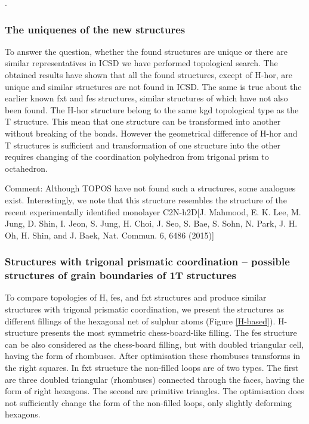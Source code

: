 .\documentclass[a4paperm]{article}
\begin{document}
\subsubsection{The uniquenes of the new structures}

To answer the question, whether the found structures are unique or there are similar representatives in ICSD we have performed topological search.
The obtained results have shown that all the found structures, except of H-hor, are unique and similar structures are not found in ICSD.
The same is true about the earlier known fxt and fes structures, similar structures of which have not also been found. 
The H-hor structure belong to the same kgd topological type as the T structure.
This mean that one structure can be transformed into another without breaking of the bonds.
However the geometrical difference of H-hor and T structures is sufficient and transformation of one structure into the other requires changing of the coordination polyhedron from trigonal prism to octahedron.

Comment:
Although TOPOS have not found such a structures, some analogues exist.
Interestingly, we note that this structure resembles the structure of the recent experimentally identified monolayer C2N-h2D[J. Mahmood, E. K. Lee, M. Jung, D. Shin, I. Jeon, S. Jung, H. Choi, J. Seo, S. Bae, S. Sohn, N. Park, J. H. Oh, H. Shin, and J.
Baek, Nat. Commun. 6, 6486 (2015)]



\subsubsection{Structures with trigonal prismatic coordination – possible structures of grain boundaries of 1T structures}

To compare topologies of H, fes, and fxt structures and produce similar structures with trigonal prismatic coordination, we present the structures as different fillings of the hexagonal net of sulphur atoms (Figure \ref{H-based}).
H-structure presents the most symmetric chess-board-like filling.
The fes structure can be also considered as the chess-board filling, but with doubled triangular cell, having the form of rhombuses.
After optimisation these rhombuses transforms in the right squares.
In fxt structure the non-filled loops are of two types.
The first are three doubled triangular (rhombuses) connected through the faces, having the form of right hexagons.
The second are primitive triangles.
The optimisation does not sufficiently change the form of the non-filled loops, only slightly deforming hexagons.
\end{document}
